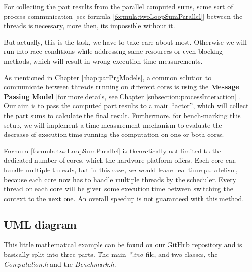For collecting the part results from the parallel computed sums, some sort of process communication [see formula \ref{formula:twoLoopSumParallel}] between the threads is necessary, more then, its impossible without it. 

\newpage

But actually, this is the task, we have to take care about most. Otherwise we will run into race conditions while addressing same resources or even blocking methods, which will result in wrong execution time measurements.

As mentioned in Chapter \ref{chap:parPrgModels}, a common solution to communicate between threads running on different cores is using the \textbf{Message Passing Model} [for more details, see Chapter \ref{subsection:processInteraction}]. Our aim is to pass the computed part results to a main ``actor'', which will collect the part sums to calculate the final result. Furthermore, for bench-marking this setup, we will implement a time measurement mechanism to evaluate the decrease of execution time running the computation on one or both cores. 

Formula \ref{formula:twoLoopSumParallel} is theoretically not limited to the dedicated number of cores, which the hardware platform offers. Each core can handle multiple threads, but in this case, we would leave real time parallelism, because each core now has to handle multiple threads by the scheduler. Every thread on each core will be given some execution time between switching the context to the next one. An overall speedup is not guaranteed with this method.   

\newpage

\subsection{UML diagram}

This little mathematical example can be found on our GitHub repository \parencite{internet12} and is basically split into three parts. The main \textit{*.ino} file, and two classes, the \textit{Computation.h} and the \textit{Benchmark.h}. 

